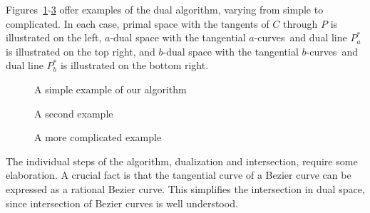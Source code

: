 \documentclass[11pt]{article}
\newcommand{\atangs}{tangential $a$-curves\ }
\newcommand{\btangs}{tangential $b$-curves\ }
\begin{document}
Figures~\ref{fig:ob2}-\ref{fig:ob3} offer examples of the dual algorithm,
varying from simple to complicated.
In each case, primal space with the tangents of $C$ through $P$ is illustrated
on the left, $a$-dual space with the \atangs and dual line $P_a^*$ is illustrated
on the top right, and $b$-dual space with the \btangs and dual line $P_b^*$ 
is illustrated on the bottom right.



\begin{figure}
\hspace{.4in} \setjjpoega
\caption{A simple example of our algorithm}
\label{fig:ob2}
\end{figure}



\begin{figure}
\hspace{.4in} \setjjpoegb
\caption{A second example}
\label{fig:ob1}
\end{figure}



\begin{figure}
\hspace{.4in} \setjjpoegc
\caption{A more complicated example}
\label{fig:ob3}
\end{figure}

%

The individual steps of the algorithm, dualization and intersection,
require some elaboration.
A crucial fact is that the tangential curve of a 
Bezier curve can be expressed as a rational Bezier curve.
This simplifies the intersection in dual space,
since intersection of Bezier curves is well understood.
\end{document}
